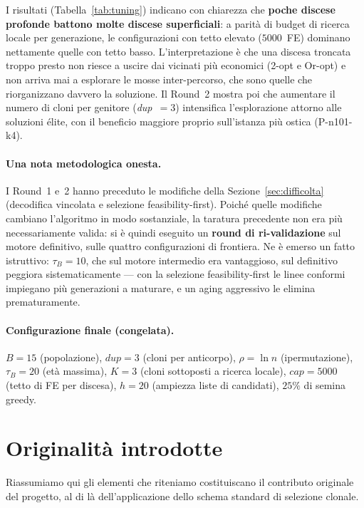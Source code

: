 \documentclass[10pt,a4paper]{article}
\begin{document}
I risultati (Tabella~\ref{tab:tuning}) indicano con chiarezza che \textbf{poche
discese profonde battono molte discese superficiali}: a parità di budget di
ricerca locale per generazione, le configurazioni con tetto elevato ($5000$~FE)
dominano nettamente quelle con tetto basso. L'interpretazione è che una discesa
troncata troppo presto non riesce a uscire dai vicinati più economici (2-opt e
Or-opt) e non arriva mai a esplorare le mosse inter-percorso, che sono quelle
che riorganizzano davvero la soluzione. Il Round~2 mostra poi che aumentare il
numero di cloni per genitore (\emph{dup}~$=3$) intensifica l'esplorazione attorno
alle soluzioni élite, con il beneficio maggiore proprio sull'istanza più ostica
(P-n101-k4).

\paragraph{Una nota metodologica onesta.} I Round~1 e~2 hanno preceduto le modifiche
della Sezione~\ref{sec:difficolta} (decodifica vincolata e selezione
feasibility-first). Poiché quelle modifiche cambiano l'algoritmo in modo
sostanziale, la taratura precedente non era più necessariamente valida: si è quindi
eseguito un \textbf{round di ri-validazione} sul motore definitivo, sulle quattro
configurazioni di frontiera. Ne è emerso un fatto istruttivo: $\tau_B=10$, che sul
motore intermedio era vantaggioso, sul definitivo peggiora sistematicamente ---
con la selezione feasibility-first le linee conformi impiegano più generazioni a
maturare, e un aging aggressivo le elimina prematuramente.

\paragraph{Configurazione finale (congelata).}
$B=15$ (popolazione), $\mathit{dup}=3$ (cloni per anticorpo), $\rho=\ln n$
(ipermutazione), $\tau_B=20$ (età massima), $K=3$ (cloni sottoposti a ricerca
locale), $\mathit{cap}=5000$ (tetto di FE per discesa), $h=20$ (ampiezza liste di
candidati), $25\%$ di semina greedy.

\section{Originalità introdotte}
\label{sec:originalita}

Riassumiamo qui gli elementi che riteniamo costituiscano il contributo originale
del progetto, al di là dell'applicazione dello schema standard di selezione
clonale.
\end{document}
